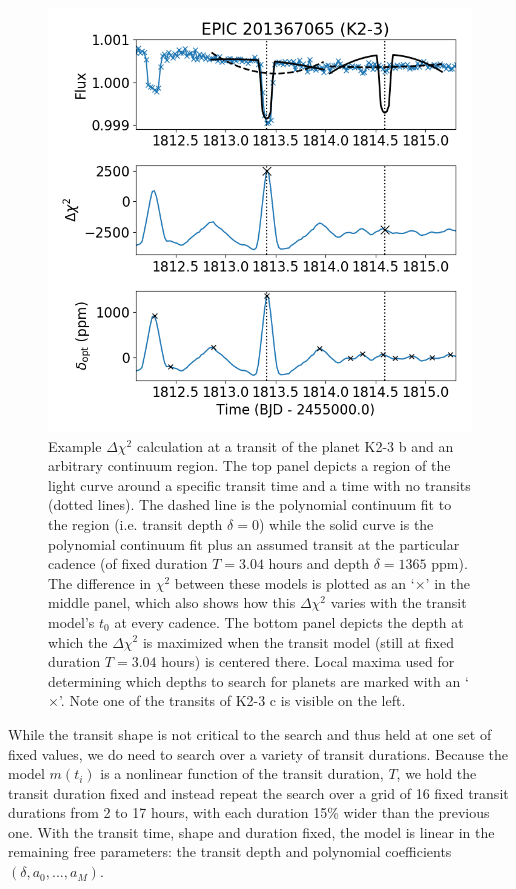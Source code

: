 \documentclass[twocolumn]{aastex62}
\begin{document}
\begin{figure}[tbp]
\includegraphics[width=\columnwidth]{dchi_example.png}
\caption{Example $\Delta\chi^2$ calculation at a transit of the planet
  K2-3 b and an arbitrary continuum region. The top panel depicts a
  region of the light curve around a specific transit time and a time
  with no transits (dotted lines). The dashed line is the polynomial
  continuum fit to the region (i.e. transit depth $\delta = 0$) while
  the solid curve is the polynomial continuum fit plus an assumed
  transit at the particular cadence (of fixed duration $T=3.04$ hours
  and depth $\delta = 1365$ ppm). The difference in $\chi^2$ between
  these models is plotted as an `$\times$' in the middle panel, which
  also shows how this $\Delta\chi^2$ varies with the transit model's
  $t_0$ at every cadence.  The bottom panel depicts the depth at which
  the $\Delta\chi^2$ is maximized when the transit model (still at
  fixed duration $T=3.04$ hours) is centered there. Local maxima used
  for determining which depths to search for planets are marked with
  an `$\times$'. Note one of the transits of K2-3 c is visible on the
  left. \label{dchis}}
\end{figure}

While the transit shape is not critical to the search and thus held at
one set of fixed values, we do need to search over a variety of
transit durations. Because the model $m(t_i)$ is a nonlinear function
of the transit duration, $T$, we hold the transit duration fixed and
instead repeat the search over a grid of 16 fixed transit durations
from 2 to 17 hours, with each duration 15\% wider than the previous
one.  With the transit time, shape and duration fixed, the model is
linear in the remaining free parameters: the transit depth and
polynomial coefficients $(\delta, a_0, ..., a_M)$.
\end{document}
